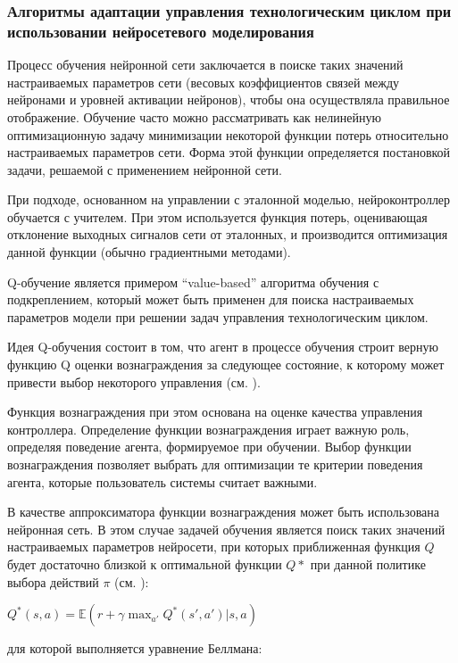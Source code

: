 \subsubsection{Алгоритмы адаптации управления технологическим циклом при использовании нейросетевого моделирования}
\label{sec_chapter_enterprise_algorithms_neural}


Процесс обучения нейронной сети заключается в поиске таких значений настраиваемых параметров сети (весовых коэффициентов связей между нейронами и уровней активации нейронов), чтобы она осуществляла правильное отображение. Обучение часто можно рассматривать как нелинейную оптимизационную задачу минимизации некоторой функции потерь относительно настраиваемых параметров сети. Форма этой функции определяется постановкой задачи, решаемой с применением нейронной сети.

При подходе, основанном на управлении с эталонной моделью, нейроконтроллер обучается с учителем. При этом используется функция потерь, оценивающая отклонение выходных сигналов сети от эталонных, и производится оптимизация данной функции (обычно градиентными методами).


Q-обучение  является примером ``value-based'' алгоритма обучения с подкреплением, который может быть применен для поиска настраиваемых параметров модели при решении задач управления технологическим циклом.


Идея Q-обучения состоит в том, что агент в процессе обучения строит верную функцию Q оценки вознаграждения за следующее состояние, к которому может привести выбор некоторого управления (см. ).


Функция вознаграждения при этом основана на оценке качества управления контроллера. Определение функции вознаграждения играет важную роль, определяя поведение агента, формируемое при обучении. Выбор функции вознаграждения позволяет выбрать для оптимизации те критерии поведения агента, которые пользователь системы считает важными.


В качестве аппроксиматора функции вознаграждения может быть использована нейронная сеть. В этом случае задачей обучения является поиск таких значений настраиваемых параметров нейросети, при которых приближенная функция $Q$ будет достаточно близкой к оптимальной функции $Q*$ при данной политике выбора действий $\pi$ (см. ):


$Q^{*}(s,a)=\mathbb{E}(r+\gamma \max_{a'}Q^{*}(s',a')|s,a) $


для которой выполняется уравнение Беллмана:

